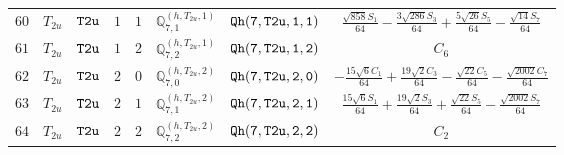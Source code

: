 \documentclass[fleqn,8pt]{jsarticle}
\begin{document}
\begin{table}[ht!]
\begin{center}
\begin{tabular}{cccccccc}
$ 60 $ & $ T_{2u} $ & $ {\tt T2u} $ & $ 1 $ & $ 1 $ & $ \mathbb{Q}_{7,1}^{(h,T_{2u},1)} $ & $ {\tt Qh(7,T2u,1,1)} $ & $ \frac{\sqrt{858} S_{1}}{64} - \frac{3 \sqrt{286} S_{3}}{64} + \frac{5 \sqrt{26} S_{5}}{64} - \frac{\sqrt{14} S_{7}}{64} $ \\
$ 61 $ & $ T_{2u} $ & $ {\tt T2u} $ & $ 1 $ & $ 2 $ & $ \mathbb{Q}_{7,2}^{(h,T_{2u},1)} $ & $ {\tt Qh(7,T2u,1,2)} $ & $ C_{6} $ \\
$ 62 $ & $ T_{2u} $ & $ {\tt T2u} $ & $ 2 $ & $ 0 $ & $ \mathbb{Q}_{7,0}^{(h,T_{2u},2)} $ & $ {\tt Qh(7,T2u,2,0)} $ & $ - \frac{15 \sqrt{6} C_{1}}{64} + \frac{19 \sqrt{2} C_{3}}{64} - \frac{\sqrt{22} C_{5}}{64} - \frac{\sqrt{2002} C_{7}}{64} $ \\
$ 63 $ & $ T_{2u} $ & $ {\tt T2u} $ & $ 2 $ & $ 1 $ & $ \mathbb{Q}_{7,1}^{(h,T_{2u},2)} $ & $ {\tt Qh(7,T2u,2,1)} $ & $ \frac{15 \sqrt{6} S_{1}}{64} + \frac{19 \sqrt{2} S_{3}}{64} + \frac{\sqrt{22} S_{5}}{64} - \frac{\sqrt{2002} S_{7}}{64} $ \\
$ 64 $ & $ T_{2u} $ & $ {\tt T2u} $ & $ 2 $ & $ 2 $ & $ \mathbb{Q}_{7,2}^{(h,T_{2u},2)} $ & $ {\tt Qh(7,T2u,2,2)} $ & $ C_{2} $ \\
 \hline \hline
\end{tabular}
\end{center}
\end{table}
\end{document}
